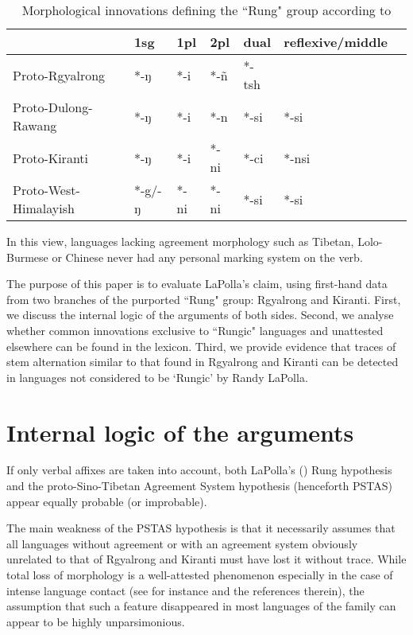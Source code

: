 \documentclass[oldfontcommands,oneside,a4paper,11pt]{article}
\begin{document}
\begin{table}[H] 
\caption{Morphological innovations defining the ``Rung" group according to \citet{lapolla03}}
\label{tab:rung1}
\begin{tabular}{lllllll} 
\toprule
  &   	1sg  &   	1pl  &   	2pl  &   	dual  &   	reflexive/middle  \\   
\midrule
Proto-Rgyalrong  &   	*-ŋ  &   	*-i  &   	*-ñ  &   	*-tsh  &   	  \\   
Proto-Dulong-Rawang  &   	*-ŋ  &   	*-i  &   	*-n  &   	*-si  &   	*-si  \\   
Proto-Kiranti  &   	*-ŋ  &   	*-i  &   	*-ni  &   	*-ci  &   	*-nsi  \\   
Proto-West-Himalayish  &   	*-g/-ŋ  &   	*-ni  &   	*-ni  &   	*-si  &   	*-si  \\   
\bottomrule
\end{tabular}
\end{table}
In this view, languages lacking agreement morphology such as Tibetan, Lolo-Burmese or Chinese never had any personal marking system on the verb. 


The purpose of this paper is to evaluate LaPolla's claim, using first-hand data from   two branches of the purported ``Rung" group: Rgyalrong and Kiranti. First, we   discuss the internal logic of the arguments of both sides. Second, we analyse whether common innovations exclusive to ``Rungic" languages and unattested elsewhere can be found in the lexicon. Third, we provide evidence that traces of stem alternation similar to that found in Rgyalrong and Kiranti can be detected in  languages not considered to be  `Rungic' by Randy LaPolla.
 

\section{Internal logic of the arguments}

If only verbal affixes are taken into account,  both LaPolla's (\citeyear{lapolla03}) Rung hypothesis and the proto-Sino-Tibetan Agreement System hypothesis (henceforth PSTAS) appear equally probable (or improbable). 

The main weakness of the PSTAS hypothesis is that it necessarily assumes that all languages without agreement or with an agreement system obviously unrelated to that of Rgyalrong and Kiranti must have lost it without trace. While total loss of morphology is a well-attested phenomenon especially in the case of intense language contact (see  \citealt{delancey10replacement} for instance and the references therein), the assumption that such a feature disappeared in most languages of the family can appear to be highly unparsimonious.
\end{document}
